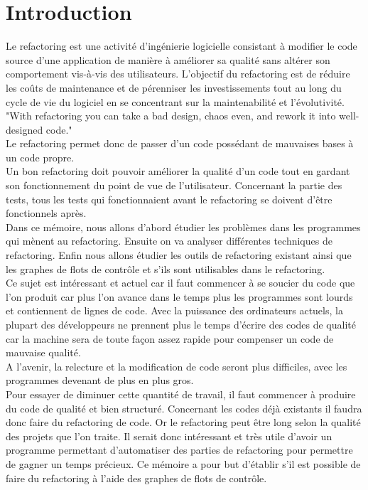 \documentclass[a4paper,twoside,12pt,openright]{report}
\begin{document}
\chapter{Introduction}
Le refactoring est une activité d'ingénierie logicielle consistant à modifier le code source d'une application de manière à améliorer sa qualité sans altérer son comportement vis-à-vis des utilisateurs.
L'objectif du refactoring est de réduire les coûts de maintenance et de pérenniser les investissements tout au long du cycle de vie du logiciel en se concentrant sur la maintenabilité et l'évolutivité.\cite{ref1}\\
"With refactoring you can take a bad design, chaos even, and rework it into well-designed code."\cite{ref2}\\
Le refactoring permet donc de passer d'un code possédant de mauvaises bases à un code propre.\\
Un bon refactoring doit pouvoir améliorer la qualité d'un code tout en gardant son fonctionnement du point de vue de l'utilisateur. Concernant la partie des tests, tous les tests qui fonctionnaient avant le refactoring se doivent d'être fonctionnels après.\\
Dans ce mémoire, nous allons d'abord étudier les problèmes dans les programmes qui mènent au refactoring. Ensuite on va analyser différentes techniques de refactoring. Enfin nous allons étudier les outils de refactoring existant ainsi que les graphes de flots de contrôle et s'ils sont utilisables dans le refactoring.\\
Ce sujet est intéressant et actuel car il faut commencer à se soucier du code que l'on produit car plus l'on avance dans le temps plus les programmes sont lourds et contiennent de lignes de code. Avec la puissance des ordinateurs actuels, la plupart des développeurs ne prennent plus le temps d'écrire des codes de qualité car la machine sera de toute façon assez rapide pour compenser un code de mauvaise qualité.\cite{ref4}\\
A l'avenir, la relecture et la modification de code seront plus difficiles, avec les programmes devenant de plus en plus gros.\cite{ref4}\\
Pour essayer de diminuer cette quantité de travail, il faut commencer à produire du code de qualité et bien structuré. Concernant les codes déjà existants il faudra donc faire du refactoring de code. Or le refactoring peut être long selon la qualité des projets que l'on traite. Il serait donc intéressant et très utile d'avoir un programme permettant d'automatiser des parties de refactoring pour permettre de gagner un temps précieux. 
Ce mémoire a pour but d'établir s'il est possible de faire du refactoring à l'aide des graphes de flots de contrôle.\cite{ref3}
\end{document}

